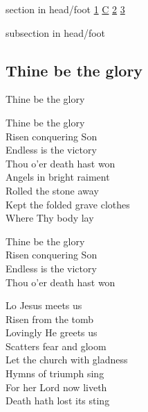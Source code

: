 \documentclass{beamer}
\begin{document}
{
{ 
 {
 \begin{beamercolorbox}[ht=4.5ex,dp=1.5ex,%
      leftskip=.3cm,rightskip=.3cm plus1fil]{section in head/foot}
 \fontsize{12}{25}\selectfont 
\hyperlink{Thine be the glory[]1}{1}
\hyperlink{Thine be the glory[]C}{C}
\hyperlink{Thine be the glory[]2}{2}
\hyperlink{Thine be the glory[]3}{3}
 
 \end{beamercolorbox}%
  \begin{beamercolorbox}[ht=2.5ex,dp=1.125ex,%
   leftskip=.3cm,rightskip=.3cm plus1fil]{subsection in head/foot}
   \insertauthor
 \end{beamercolorbox}%
 }
}
\subsection{ Thine be the glory }

\hypertarget{Thine be the glory[]1}{}
\begin{frame}{Thine be the glory }
\fontsize{ 18 }{ 23 }\selectfont

Thine be the glory\\ 
Risen conquering Son\\ 
Endless is the victory\\ 
Thou o'er death hast won\\ 
Angels in bright raiment\\ 
Rolled the stone away\\ 
Kept the folded grave clothes\\ 
Where Thy body lay 

\end{frame}

\hypertarget{Thine be the glory[]C}{}
\begin{frame}{}
\fontsize{ 18 }{ 23 }\selectfont

Thine be the glory\\ 
Risen conquering Son\\ 
Endless is the victory\\ 
Thou o'er death hast won 

\end{frame}

\hypertarget{Thine be the glory[]2}{}
\begin{frame}{}
\fontsize{ 18 }{ 23 }\selectfont

Lo Jesus meets us\\ 
Risen from the tomb\\ 
Lovingly He greets us\\ 
Scatters fear and gloom\\ 
Let the church with gladness\\ 
Hymns of triumph sing\\ 
For her Lord now liveth\\ 
Death hath lost its sting 


\end{frame}}
\end{document}
